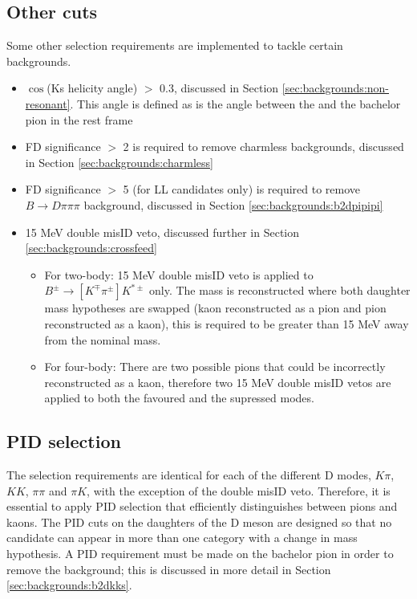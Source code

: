 \subsection{Other cuts}

Some other selection requirements are implemented to tackle certain backgrounds.

\begin{itemize}
\item{\textbar $\cos$(Ks helicity angle) \textbar $>$ 0.3, discussed in Section \ref{sec:backgrounds:non-resonant}. This angle is defined as is the angle between the \KS and the bachelor pion in the \Kstarm rest frame}
\item{\Dz FD significance $>$ 2 is required to remove charmless backgrounds, discussed in Section \ref{sec:backgrounds:charmless}}
\item{\KS FD significance $>$ 5 (for LL candidates only) is required to remove $B \to D\pi\pi\pi$ background, discussed in Section \ref{sec:backgrounds:b2dpipipi}}
\item{15 MeV double misID veto, discussed further in Section \ref{sec:backgrounds:crossfeed}}
\begin{itemize}
\item For two-body: 15 MeV double misID veto is applied to $B^{\pm} \to [K^{\mp}\pi^{\pm}] K^{*\pm}$ only. The \Dz mass is reconstructed where both daughter mass hypotheses are swapped (kaon reconstructed as a pion and pion reconstructed as a kaon), this is required to be greater than 15 MeV away from the nominal \Dz mass.
\item For four-body: There are two possible pions that could be incorrectly reconstructed as a kaon, therefore two 15 MeV double misID vetos are applied to both the favoured and the supressed modes. 
\end{itemize} 
\end{itemize}


\subsection{PID selection}
\label{sec:selection:pid}

The selection requirements are identical for each of the different D modes, $K\pi$, $KK$, $\pi\pi$ and $\pi K$, with the exception of the double misID veto. Therefore, it is essential to apply PID selection that efficiently distinguishes between pions and kaons. The PID cuts on the daughters of the D meson are designed so that no  candidate can appear in more than one category with a change in mass hypothesis. A PID requirement must be made on the bachelor pion in order to remove the \decay{\B}{\D\KS\kaon} background; this is discussed in more detail in Section \ref{sec:backgrounds:b2dkks}. 

